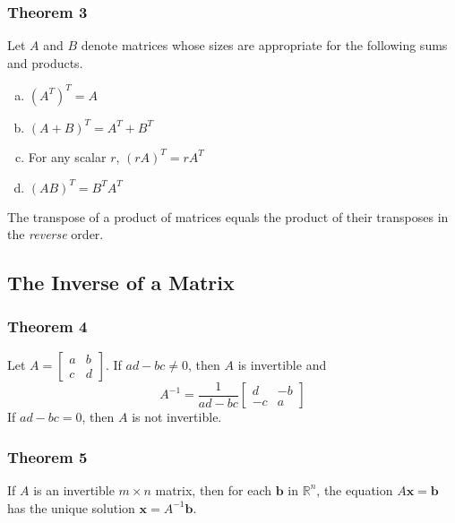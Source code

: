 \documentclass[letterpaper,11pt]{article}
\begin{document}
			\subsubsection{Theorem 3}
				Let $A$ and $B$ denote matrices whose sizes are appropriate for the following sums and products.
				\begin{enumerate}[a.]
					\item $(A^T)^T=A$
					\item $(A+B)^T=A^T+B^T$
					\item For any scalar $r$, $(rA)^T=rA^T$
					\item $(AB)^T=B^TA^T$
				\end{enumerate}
				
				The transpose of a product of matrices equals the product of their transposes in the \textit{reverse} order.
		\subsection{The Inverse of a Matrix}
			\subsubsection{Theorem 4}
				Let $A=\begin{bmatrix}
					a & b \\ c & d
				\end{bmatrix}$. If $ad-bc\neq 0$, then $A$ is invertible and
				\begin{equation}
					A^{-1}=\frac{1}{ad-bc}
					\begin{bmatrix}
						d & -b \\ -c & a
					\end{bmatrix}
				\end{equation}
				If $ad-bc=0$, then $A$ is not invertible.
			\subsubsection{Theorem 5}
				If $A$ is an invertible $m\times n$ matrix, then for each $\mathbf{b}$ in $\mathbb{R}^n$, the equation $A\mathbf{x}=\mathbf{b}$ has the unique solution $\mathbf{x}=A^{-1}\mathbf{b}$.
\end{document}
